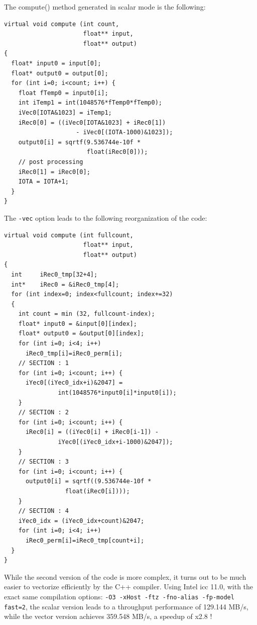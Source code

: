 \documentclass[a4paper]{book}
\begin{document}
The compute() method generated in scalar mode is the following:

\begin{lstlisting}
virtual void compute (int count, 
                      float** input, 
                      float** output) 
{
  float* input0 = input[0];
  float* output0 = output[0];
  for (int i=0; i<count; i++) {
    float fTemp0 = input0[i];
    int iTemp1 = int(1048576*fTemp0*fTemp0);
    iVec0[IOTA&1023] = iTemp1;
    iRec0[0] = ((iVec0[IOTA&1023] + iRec0[1])
                    - iVec0[(IOTA-1000)&1023]);
    output0[i] = sqrtf(9.536744e-10f * 
                       float(iRec0[0]));
    // post processing
    iRec0[1] = iRec0[0];
    IOTA = IOTA+1;
  }
}
\end{lstlisting}

The \lstinline!-vec! option leads to the following reorganization of the code:
\begin{lstlisting}
virtual void compute (int fullcount, 
                      float** input, 
                      float** output) 
{
  int     iRec0_tmp[32+4];
  int*    iRec0 = &iRec0_tmp[4];
  for (int index=0; index<fullcount; index+=32) 
  {
    int count = min (32, fullcount-index);
    float* input0 = &input[0][index];
    float* output0 = &output[0][index];
    for (int i=0; i<4; i++) 
      iRec0_tmp[i]=iRec0_perm[i];
    // SECTION : 1
    for (int i=0; i<count; i++) {
      iYec0[(iYec0_idx+i)&2047] =
               int(1048576*input0[i]*input0[i]);
    }
    // SECTION : 2
    for (int i=0; i<count; i++) {
      iRec0[i] = ((iYec0[i] + iRec0[i-1]) - 
               iYec0[(iYec0_idx+i-1000)&2047]);
    }
    // SECTION : 3
    for (int i=0; i<count; i++) {
      output0[i] = sqrtf((9.536744e-10f * 
                 float(iRec0[i])));
    }
    // SECTION : 4
    iYec0_idx = (iYec0_idx+count)&2047;
    for (int i=0; i<4; i++)
      iRec0_perm[i]=iRec0_tmp[count+i];
  }
}
\end{lstlisting}

While the second version of the code is more complex, it turns out to be much easier to vectorize efficiently by the C++ compiler. Using Intel icc 11.0, with the exact same compilation options: \texttt{-O3 -xHost -ftz -fno-alias -fp-model fast=2}, the scalar version leads to a throughput performance of 129.144  MB/s, while the vector version achieves 359.548  MB/s, a speedup of x2.8 ! 
\end{document}
